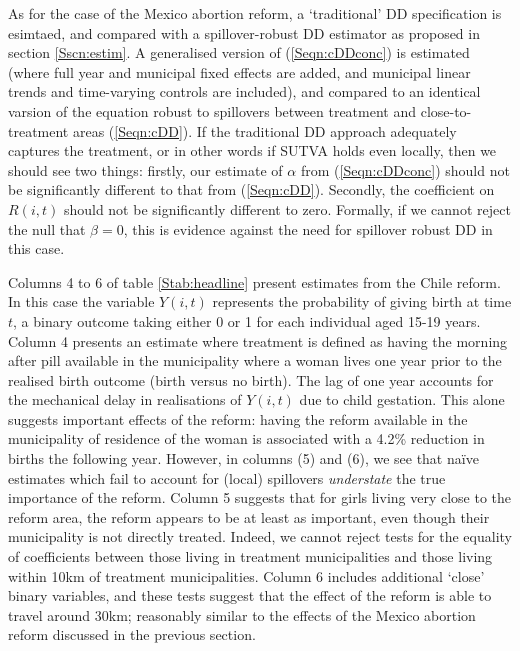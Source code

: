 \documentclass{article}
\begin{document}
\begin{spacing}{1.1}
As for the case of the Mexico abortion reform, a `traditional' DD specification
is esimtaed, and compared with a spillover-robust DD estimator as proposed in
section \ref{Sscn:estim}.  A generalised version of (\ref{Seqn:cDDconc}) is 
estimated (where full year and municipal fixed effects are added, and municipal 
linear trends and time-varying controls are included), and compared to an 
identical varsion of the equation robust to spillovers between treatment and 
close-to-treatment areas (\ref{Seqn:cDD}).  If the traditional DD approach 
adequately captures the treatment, or in other words if SUTVA holds even locally,
then we should see two things: firstly, our estimate of $\alpha$ from 
(\ref{Seqn:cDDconc}) should not be significantly different to that from 
(\ref{Seqn:cDD}). Secondly, the coefficient on $R(i,t)$ should not be 
significantly different to zero.  Formally, if we cannot reject the null that 
$\beta=0$, this is evidence against the need for spillover robust DD in this 
case.

Columns 4 to 6 of table \ref{Stab:headline} present estimates from the Chile
reform.  In this case the variable $Y(i,t)$ represents the probability of giving
birth at time $t$, a binary outcome taking either 0 or 1 for each individual aged 
15-19 years. Column 4 presents an estimate where treatment is defined as having
the morning after pill available in the municipality where a woman lives one
year prior to the realised birth outcome (birth versus no birth).  The lag of
one year accounts for the mechanical delay in realisations of $Y(i,t)$ due to 
child gestation.  This alone suggests important effects of the reform: having the
reform available in the municipality of residence of the woman is associated with
a 4.2\% reduction in births the following year.  However, in columns (5) and (6),
we see that na\"ive estimates which fail to account for (local) spillovers 
\emph{understate} the true importance of the reform.  Column 5 suggests that
for girls living very close to the reform area, the reform appears to be at least
as important, even though their municipality is not directly treated.  Indeed,
we cannot reject tests for the equality of coefficients between those living
in treatment municipalities and those living within 10km of treatment 
municipalities.  Column 6 includes additional `close' binary variables, and
these tests suggest that the effect of the reform is able to travel around 30km;
reasonably similar to the effects of the Mexico abortion reform discussed in 
the previous section.


\end{spacing}
\end{document}

